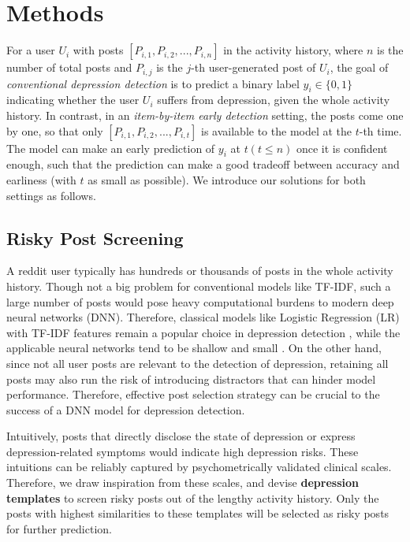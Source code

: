 \section{Methods}


For a user $U_i$ with posts $[P_{i,1}, P_{i,2}, ..., P_{i,n}]$ in the activity history, where $n$ is the number of total posts and $P_{i,j}$ is the $j$-th user-generated post of $U_i$, the goal of \textit{conventional depression detection} is to predict a binary label $y_i \in \{0, 1\}$ indicating whether the user $U_i$ suffers from depression, given the whole activity history. In contrast, in an \textit{item-by-item early detection} setting, the posts come one by one, so that only $[P_{i,1}, P_{i,2}, ..., P_{i,t}]$ is available to the model at the $t$-th time. The model can make an early prediction of $y_i$ at $t (t \leq n)$ once it is confident enough, such that the prediction can make a good tradeoff between accuracy and earliness (with $t$ as small as possible). We introduce our solutions for both settings as follows. 

\subsection{Risky Post Screening}
\label{sec:screening}

A reddit user typically has hundreds or thousands of posts in the whole activity history. Though not a big problem for conventional models like TF-IDF, such a large number of posts would pose heavy computational burdens to modern deep neural networks (DNN). Therefore, classical models like Logistic Regression (LR) with TF-IDF features remain a popular choice in depression detection \citep{zhou2021detecting}, while the applicable neural networks tend to be shallow and small \citep{yates2017depression}. On the other hand, since not all user posts are relevant to the detection of depression, retaining all posts may also run the risk of introducing distractors that can hinder model performance. Therefore, effective post selection strategy can be crucial to the success of a DNN model for depression detection. 

Intuitively, posts that directly disclose the state of depression or express depression-related symptoms would indicate high depression risks. These intuitions can be reliably captured by psychometrically validated clinical scales. Therefore, we draw inspiration from these scales, and devise \textbf{depression templates} to screen risky posts out of the lengthy activity history. Only the posts with highest similarities to these templates will be selected as risky posts for further prediction.

